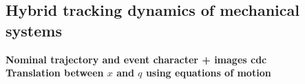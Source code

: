 \documentclass[../DC2017114Bouma.tex]{subfiles}
\begin{document}
%

\subsection{Hybrid tracking dynamics of mechanical systems}
\textbf{Nominal trajectory and event character + images cdc}\\
\textbf{Translation between $x$ and $q$ using equations of motion}\\
\end{document}
